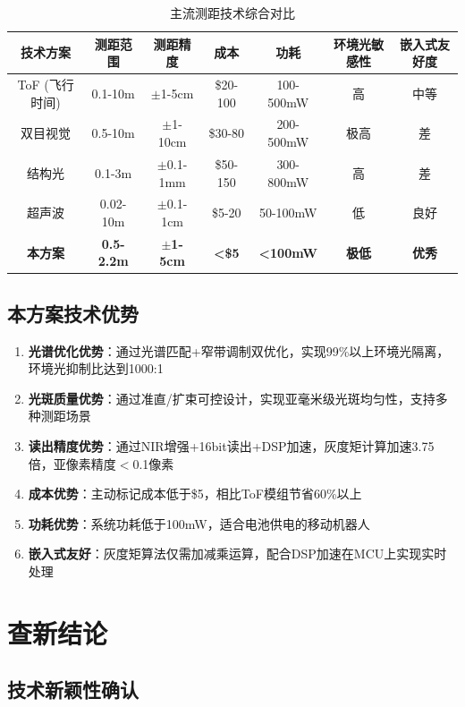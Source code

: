 \documentclass[12pt, a4paper]{ctexart}
\begin{document}
\begin{table}[htbp]
\centering
\caption{主流测距技术综合对比}
\begin{tabular}{ccccccc}
\toprule
技术方案 & 测距范围 & 测距精度 & 成本 & 功耗 & 环境光敏感性 & 嵌入式友好度 \\
\midrule
ToF (飞行时间) & 0.1-10m & $\pm$1-5cm & \$20-100 & 100-500mW & 高 & 中等 \\
双目视觉 & 0.5-10m & $\pm$1-10cm & \$30-80 & 200-500mW & 极高 & 差 \\
结构光 & 0.1-3m & $\pm$0.1-1mm & \$50-150 & 300-800mW & 高 & 差 \\
超声波 & 0.02-10m & $\pm$0.1-1cm & \$5-20 & 50-100mW & 低 & 良好 \\
\textbf{本方案} & \textbf{0.5-2.2m} & \textbf{$\pm$1-5cm} & \textbf{<\$5} & \textbf{<100mW} & \textbf{极低} & \textbf{优秀} \\
\bottomrule
\end{tabular}
\end{table}

\subsection{本方案技术优势}

\begin{enumerate}
\item \textbf{光谱优化优势}：通过光谱匹配+窄带调制双优化，实现99\%以上环境光隔离，环境光抑制比达到1000:1
\item \textbf{光斑质量优势}：通过准直/扩束可控设计，实现亚毫米级光斑均匀性，支持多种测距场景
\item \textbf{读出精度优势}：通过NIR增强+16bit读出+DSP加速，灰度矩计算加速3.75倍，亚像素精度$<$0.1像素
\item \textbf{成本优势}：主动标记成本低于\$5，相比ToF模组节省60\%以上
\item \textbf{功耗优势}：系统功耗低于100mW，适合电池供电的移动机器人
\item \textbf{嵌入式友好}：灰度矩算法仅需加减乘运算，配合DSP加速在MCU上实现实时处理
\end{enumerate}

\section{查新结论}

\subsection{技术新颖性确认}
\end{document}
